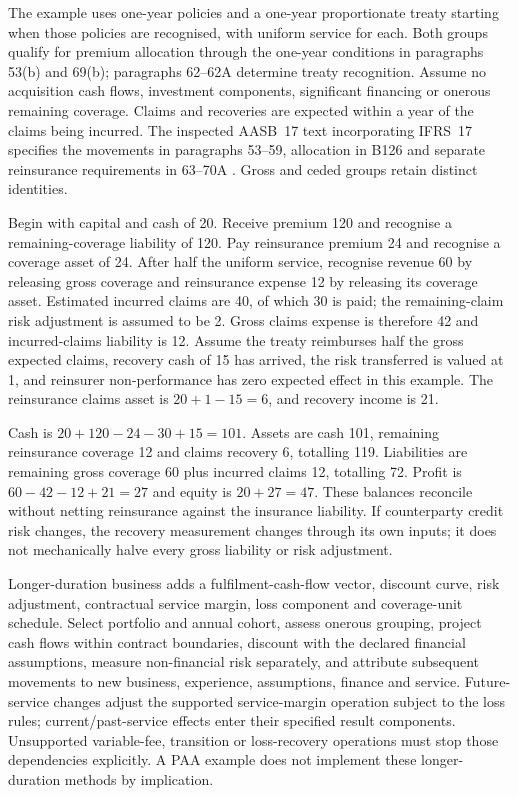The example uses one-year policies and a one-year proportionate treaty starting
when those policies are recognised, with uniform service for each. Both groups
qualify for premium allocation through the one-year conditions in paragraphs
53(b) and 69(b); paragraphs 62--62A determine treaty recognition. Assume no
acquisition cash flows, investment components, significant financing or onerous
remaining coverage. Claims and recoveries are expected within a year of the
claims being incurred. The inspected AASB~17 text incorporating IFRS~17 specifies
the movements in paragraphs 53--59, allocation in B126 and separate reinsurance
requirements in 63--70A \citep{aasb17}. Gross and ceded groups retain distinct
identities.

Begin with capital and cash of 20. Receive premium 120 and recognise a
remaining-coverage liability of 120. Pay reinsurance premium 24 and recognise
a coverage asset of 24. After half the uniform service, recognise revenue 60
by releasing gross coverage and reinsurance expense 12 by releasing its
coverage asset. Estimated incurred claims are 40, of which 30 is paid;
the remaining-claim risk adjustment is assumed to be 2. Gross claims expense
is therefore 42 and incurred-claims liability is 12. Assume the treaty
reimburses half the gross expected claims, recovery cash of 15 has arrived,
the risk transferred is valued at 1, and reinsurer non-performance has zero
expected effect in this example. The reinsurance claims asset is
$20+1-15=6$, and recovery income is 21.

Cash is $20+120-24-30+15=101$. Assets are cash 101, remaining reinsurance
coverage 12 and claims recovery 6, totalling 119. Liabilities are remaining
gross coverage 60 plus incurred claims 12, totalling 72. Profit is
$60-42-12+21=27$ and equity is $20+27=47$. These balances reconcile without
netting reinsurance against the insurance liability. If counterparty credit
risk changes, the recovery measurement changes through its own inputs; it
does not mechanically halve every gross liability or risk adjustment.

Longer-duration business adds a fulfilment-cash-flow vector, discount curve,
risk adjustment, contractual service margin, loss component and coverage-unit
schedule. Select portfolio and annual cohort, assess onerous grouping, project
cash flows within contract boundaries, discount with the declared financial
assumptions, measure non-financial risk separately, and attribute subsequent
movements to new business, experience, assumptions, finance and service.
Future-service changes adjust the supported service-margin operation subject
to the loss rules; current/past-service effects enter their specified result
components. Unsupported variable-fee, transition or loss-recovery operations
must stop those dependencies explicitly. A PAA example does not implement
these longer-duration methods by implication.

